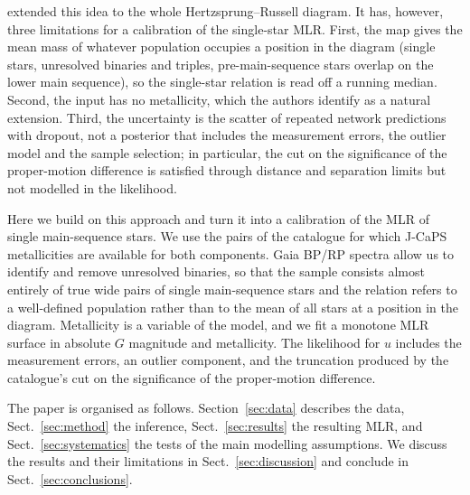 \documentclass{aa}
\newcommand{\msun}{M_{\odot}}
\begin{document}
\citet{Hwang2024DynamicalMasses} extended this idea to the whole Hertzsprung--Russell diagram. 
It has, however, three limitations for a calibration of the single-star MLR. First, the map gives the mean mass of whatever population occupies a position in the diagram (single stars, unresolved binaries and triples, pre-main-sequence stars overlap on the lower main sequence), so the single-star relation is read off a running median. Second, the input has no metallicity, which the authors identify as a natural extension. Third, the uncertainty is the scatter of repeated network predictions with dropout, not a posterior that includes the measurement errors, the outlier model and the sample selection; in particular, the cut on the significance of the proper-motion difference is satisfied through distance and separation limits but not modelled in the likelihood.

Here we build on this approach and turn it into a calibration of the MLR of single main-sequence stars. We use the pairs of the \citet{ElBadry2021MillionBinaries} catalogue for which J-CaPS metallicities \citep{Li2026JCaPS} are available for both components. Gaia BP/RP spectra allow us to identify and remove unresolved binaries, so that the sample consists almost entirely of true wide pairs of single main-sequence stars and the relation refers to a well-defined population rather than to the mean of all stars at a position in the diagram. Metallicity is a variable of the model, and we fit a monotone MLR surface in absolute $G$ magnitude and metallicity. The likelihood for $u$ includes the measurement errors, an outlier component, and the truncation produced by the catalogue's cut on the significance of the proper-motion difference.

The paper is organised as follows. Section~\ref{sec:data} describes the data, Sect.~\ref{sec:method} the inference, Sect.~\ref{sec:results} the resulting MLR, and Sect.~\ref{sec:systematics} the tests of the main modelling assumptions. We discuss the results and their limitations in Sect.~\ref{sec:discussion} and conclude in Sect.~\ref{sec:conclusions}.
\end{document}
